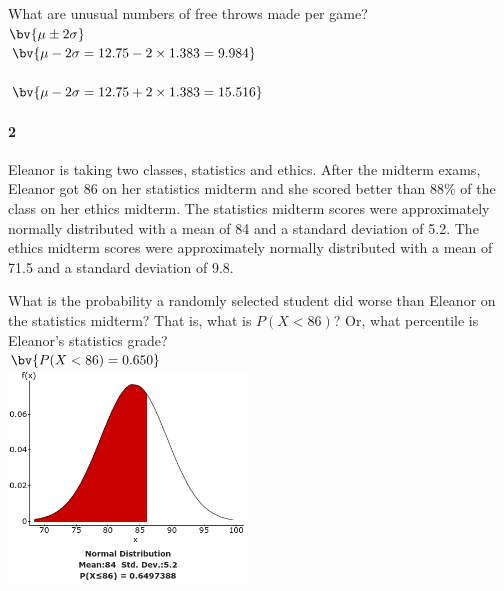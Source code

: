 \documentclass{article}
\begin{document}
\begin{flushleft}
\begin{enumalpha}
\newpage
\item What are unusual numbers of free throws made per game?\\
\medskip
{}$\bv{\mu \pm 2 \sigma}$\\
\medskip
$\bv{\mu - 2\sigma = 12.75 - 2\times 1.383 = 9.984}$\\
\\
\medskip
$\bv{\mu - 2\sigma = 12.75 + 2\times 1.383 = 15.516}$\\

\end{enumalpha}

\newpage

\paragraph{2} Eleanor is taking two classes, statistics and ethics. After the midterm exams, Eleanor got 86 on her statistics midterm and she scored better than 88\% of the class on her ethics midterm. The statistics midterm scores were approximately normally distributed with a mean of 84 and a standard deviation of 5.2. The ethics midterm scores were approximately normally distributed with a mean of 71.5 and a standard deviation of 9.8. 

\begin{enumalpha}
\item What is the probability a randomly selected student did worse than Eleanor on the statistics midterm? That is, what is $P(X < 86)$? Or, what percentile is Eleanor's statistics grade?\\
\medskip
$\bv{P(X < 86) = 0.650}$\\
\smallskip
\includegraphics[width=2.5in]{images/group06_Q2_a}\\


\end{enumalpha}
\end{flushleft}
\end{document}
